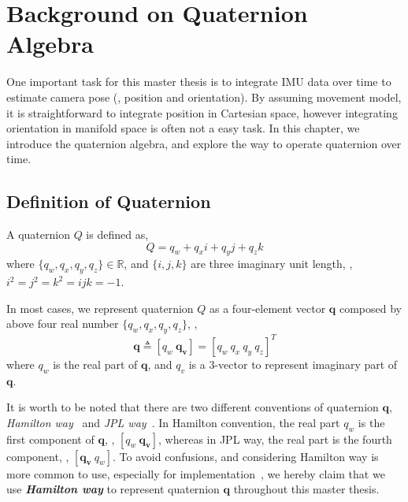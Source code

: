 \chapter{Background on Quaternion Algebra}
\label{chap:background}

One important task for this master thesis is to integrate IMU data over time to estimate camera pose (\eg, position and orientation). By assuming movement model, it is straightforward to integrate position in Cartesian space, however integrating orientation in manifold space is often not a easy task. In this chapter, we introduce the quaternion algebra, and explore the way to operate quaternion over time.

\section{Definition of Quaternion}
\label{sec:def_of_quat}

A quaternion $Q$ is defined as,
\begin{equation}\label{q1}
	Q = q_w + q_xi + q_yj + q_zk
\end{equation}
where $\{q_w,q_x,q_y,q_z\} \in \mathbb{R}$, and $\{i,j,k\}$ are three imaginary unit length, \eg, $i^2=j^2=k^2=ijk=-1$.

In most cases, we represent quaternion $Q$ as a four-element vector $\textbf{q}$ composed by above four real number $\{q_w,q_x,q_y,q_z\}$, \ie,
\begin{equation}\label{q2}
	\mathbf{q} \triangleq \left[q_w \ \mathbf{q_v}\right] = \left[q_w \ q_x \ q_y \ q_z \right]^T
\end{equation}
where $q_w$ is the real part of $\textbf{q}$, and $q_v$ is a 3-vector to represent imaginary part of $\textbf{q}$. 

It is worth to be noted that there are two different conventions of quaternion $\textbf{q}$, \textit{Hamilton way}~\cite{hamilton1844ii} and \textit{JPL way}~\cite{breckenridge1999quaternions}. In Hamilton convention, the real part $q_w$ is the first component of $\textbf{q}$, \ie, $\left[q_w \ \mathbf{q_v}\right]$, whereas in JPL way, the real part is the fourth component, \ie, $\left[\mathbf{q_v} \ q_w\right]$. To avoid confusions, and considering Hamilton way is more common to use, especially for implementation~\cite{guennebaud2010eigen, hess2007essential}, we hereby claim that we use \textbf{\textit{Hamilton way}} to represent quaternion $\textbf{q}$ throughout this master thesis. 

